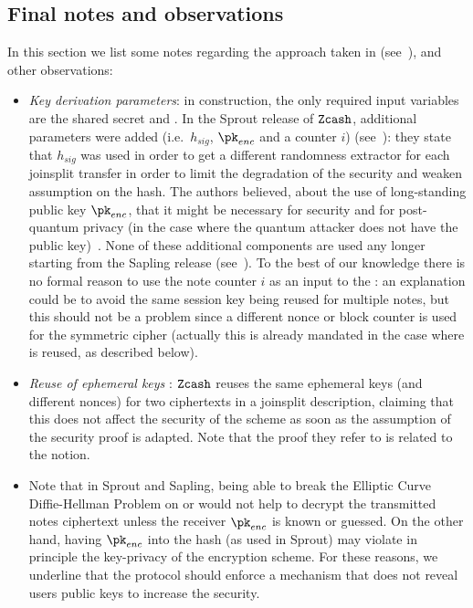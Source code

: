 \subsection{Final notes and observations}\label{instantiation:enc:final-notes}

In this section we list some notes regarding the approach taken in \zcash{} (see~\cite[Section 8.7]{zcashprotocol}), and other observations:
\begin{itemize}
    \item \emph{Key derivation parameters}: in \dhaes{} construction, the only required input variables are the shared secret \sharedSecret{} and \epk. In the Sprout release of $\texttt{Zcash}{}$, additional parameters were added (i.e.~$h_{sig}$, $\pk_{enc}$ and a counter $i$) (see~\cite[5.4.4.2]{zcashprotocol}): they state that $h_{sig}$ was used in order to get a different randomness extractor for each joinsplit transfer in order to limit the degradation of the security and weaken assumption on the hash. The authors believed, about the use of long-standing public key $\pk_{enc}$, that it might be necessary for \indccaii{} security and for post-quantum privacy (in the case where the quantum attacker does not have the public key)~\cite{zcashforum2019encsec}. None of these additional components are used any longer starting from the Sapling release (see~\cite[5.4.4.4]{zcashprotocol}). To the best of our knowledge there is no formal reason to use the note counter $i$ as an input to the \kdf{}: an explanation could be to avoid the same session key being reused for multiple notes, but this should not be a problem since a different nonce or block counter is used for the symmetric cipher (actually this is already mandated in the case where \epk{} is reused, as described below).
    \item \emph{Reuse of ephemeral keys} \epk: $\texttt{Zcash}{}$ reuses the same ephemeral keys \epk{} (and different nonces) for two ciphertexts in a joinsplit description, claiming that this does not affect the security of the scheme as soon as the \hdhi{} assumption of the \dhaes{} security proof is adapted. Note that the proof they refer to is related to the \indccaii{} notion.
    \item Note that in \zcash{} Sprout and Sapling, being able to break the Elliptic Curve Diffie-Hellman Problem on  or \jubjub{} would not help to decrypt the transmitted notes ciphertext unless the receiver $\pk_{enc}$ is known or guessed. On the other hand, having $\pk_{enc}$ into the hash (as used in Sprout) may violate in principle the key-privacy of the encryption scheme. For these reasons, we underline that the protocol should enforce a mechanism that does not reveal users public keys to increase the security.

\end{itemize}
